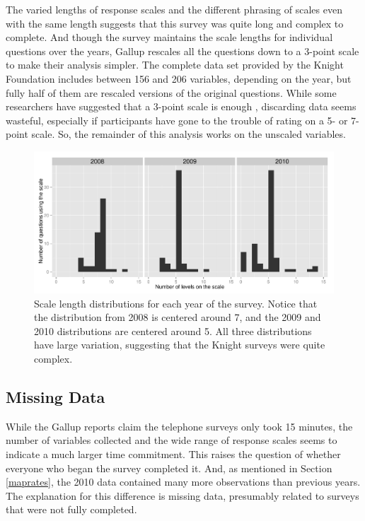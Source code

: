 \documentclass[smallextended]{svjour3}\usepackage[]{graphicx}\usepackage[]{color}
\newenvironment{knitrout}{}{} %
\begin{document}
The varied lengths of response scales and the different phrasing of scales even with the same length suggests that this survey was quite long and complex to complete. And though the survey maintains the scale lengths for individual questions over the years, Gallup rescales all the questions down to a 3-point scale to make their analysis simpler. The complete data set provided by the Knight Foundation includes between 156 and 206 variables, depending on the year, but fully half of them are rescaled versions of the original questions. While some researchers have suggested that a 3-point scale is enough \citep{JacMat1971}, discarding data seems wasteful, especially if participants have gone to the trouble of rating on a 5- or 7-point scale. So, the remainder of this analysis works on the unscaled variables. 
\begin{knitrout}
\color{fgcolor}\begin{figure}

{\centering \includegraphics[width=0.99\linewidth]{figure/LikertSizes-1} 

}

\caption[Scale length distributions for each year of the survey]{Scale length distributions for each year of the survey. Notice that the distribution from 2008 is centered around 7, and the 2009 and 2010 distributions are centered around 5. All three distributions have large variation, suggesting that the Knight surveys were quite complex.}\label{fig:LikertSizes}
\end{figure}


\end{knitrout}

\subsection{Missing Data}
\label{missingdata}
While the Gallup reports claim the telephone surveys only took 15 minutes, the number of variables collected and the wide range of response scales seems to indicate a much larger time commitment. This raises the question of whether everyone who began the survey completed it. And, as mentioned in Section \ref{maprates}, the 2010 data contained many more observations than previous years. The explanation for this difference is missing data, presumably related to surveys that were not fully completed. 
\end{document}
